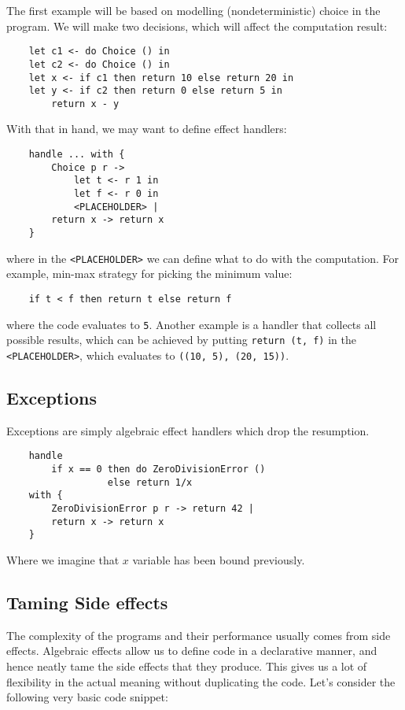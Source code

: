 \documentclass[declaration,shortabstract]{iithesis}
\theoremstyle{definition} \newtheorem{definition}{Definition}[chapter]
\theoremstyle{remark} \newtheorem{remark}[definition]{Observation}
\theoremstyle{plain} \newtheorem{theorem}[definition]{Theorem}
\theoremstyle{plain} \newtheorem{lemma}[definition]{Lemma}
\begin{document}
    The first example will be based on modelling (nondeterministic) choice
    in the program. We will make two decisions, which will affect the computation
    result:

\begin{verbatim}
    let c1 <- do Choice () in
    let c2 <- do Choice () in
    let x <- if c1 then return 10 else return 20 in
    let y <- if c2 then return 0 else return 5 in
        return x - y
\end{verbatim}
    With that in hand, we may want to define effect handlers:

\begin{verbatim}
    handle ... with {
        Choice p r ->
            let t <- r 1 in
            let f <- r 0 in
            <PLACEHOLDER> |
        return x -> return x
    }
\end{verbatim}
    where in the \verb!<PLACEHOLDER>! we can define what to do with the
    computation. For example, min-max strategy for picking the minimum value:

\begin{verbatim}
    if t < f then return t else return f
\end{verbatim}
    where the code evaluates to \verb!5!. Another example is a handler that
    collects all possible results, which can be achieved by putting
    \verb!return (t, f)! in the \verb!<PLACEHOLDER>!, which evaluates to
    \verb!((10, 5), (20, 15))!.

    \subsection{Exceptions}

    Exceptions are simply algebraic effect handlers which drop the resumption.

\begin{verbatim}
    handle
        if x == 0 then do ZeroDivisionError ()
                  else return 1/x
    with {
        ZeroDivisionError p r -> return 42 |
        return x -> return x
    }
\end{verbatim}
    Where we imagine that $x$ variable has been bound previously.

    \subsection{Taming Side effects}

    The complexity of the programs and their performance usually comes from side effects.
    Algebraic effects allow us to define code in a declarative manner, and hence
    neatly tame the side effects that they produce. This gives us a lot of flexibility
    in the actual meaning without duplicating the code. Let's consider the following
    very basic code snippet:
\end{document}
